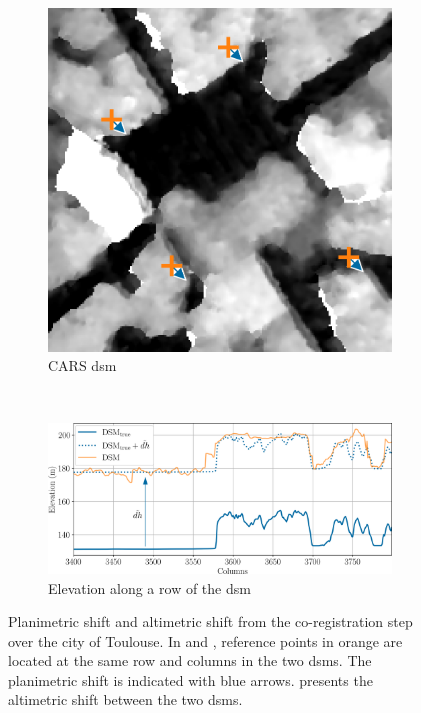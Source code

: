 \begin{figure}
\begin{subfigure}[t]{0.48\linewidth}
        \includegraphics[width=\linewidth]{Images/Chap_6/coregisration_planimetric_shift_cars_toulouse.png}
        \caption{CARS \acrshort{dsm}}
        \label{fig:coregistration_planimetric_cars}
    \end{subfigure}\\
    \begin{subfigure}[t]{\linewidth}
        \centering
        \includegraphics[width=\linewidth]{Images/Chap_6/coregisration_altimetric_shift_toulouse.png}
        \caption{Elevation along a row of the \acrshort{dsm}}
        \label{fig:coregistration_altimetric}
    \end{subfigure}
    \caption{Planimetric shift and altimetric shift from the co-registration step over the city of Toulouse. In  and , reference points in orange are located at the same row and columns in the two \acrshort{dsm}s. The planimetric shift is indicated with blue arrows.  presents the altimetric shift between the two \acrshort{dsm}s.}
    \label{fig:coregistration_image}
\end{figure}


